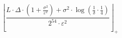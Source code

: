 \[\left\lfloor \frac{L \cdot \Delta \cdot \left(1 + \frac{\sigma^{2}}{\varepsilon^{2}}\right) + \sigma^{2} \cdot \log\left(\frac{1}{\delta} \cdot \frac{1}{4}\right)}{2^{54} \cdot \varepsilon^{2}} \right\rfloor_{+}\]
